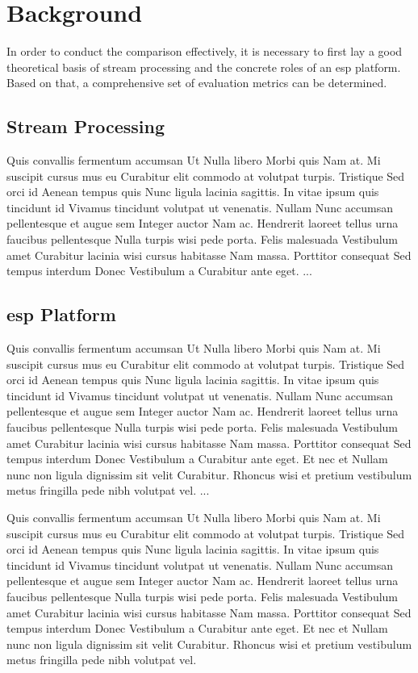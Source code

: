 \chapter{Background} \label{chap:background}
In order to conduct the comparison effectively, it is necessary to first lay a good theoretical basis of stream processing and the concrete roles of an \acrlong{esp} platform. Based on that, a comprehensive set of evaluation metrics can be determined.

\section{Stream Processing}
Quis convallis fermentum accumsan Ut Nulla libero Morbi quis Nam at. Mi suscipit cursus mus eu Curabitur elit commodo at volutpat turpis. Tristique Sed orci id Aenean tempus quis Nunc ligula lacinia sagittis. In vitae ipsum quis tincidunt id Vivamus tincidunt volutpat ut venenatis. Nullam Nunc accumsan pellentesque et augue sem Integer auctor Nam ac. Hendrerit laoreet tellus urna faucibus pellentesque Nulla turpis wisi pede porta. Felis malesuada Vestibulum amet Curabitur lacinia wisi cursus habitasse Nam massa. Porttitor consequat Sed tempus interdum Donec Vestibulum a Curabitur ante eget.
...

\section{\acrlong{esp} Platform}
Quis convallis fermentum accumsan Ut Nulla libero Morbi quis Nam at. Mi suscipit cursus mus eu Curabitur elit commodo at volutpat turpis. Tristique Sed orci id Aenean tempus quis Nunc ligula lacinia sagittis. In vitae ipsum quis tincidunt id Vivamus tincidunt volutpat ut venenatis. Nullam Nunc accumsan pellentesque et augue sem Integer auctor Nam ac. Hendrerit laoreet tellus urna faucibus pellentesque Nulla turpis wisi pede porta. Felis malesuada Vestibulum amet Curabitur lacinia wisi cursus habitasse Nam massa. Porttitor consequat Sed tempus interdum Donec Vestibulum a Curabitur ante eget. Et nec et Nullam nunc non ligula dignissim sit velit Curabitur. Rhoncus wisi et pretium vestibulum metus fringilla pede nibh volutpat vel. ...

Quis convallis fermentum accumsan Ut Nulla libero Morbi quis Nam at. Mi suscipit cursus mus eu Curabitur elit commodo at volutpat turpis. Tristique Sed orci id Aenean tempus quis Nunc ligula lacinia sagittis. In vitae ipsum quis tincidunt id Vivamus tincidunt volutpat ut venenatis. Nullam Nunc accumsan pellentesque et augue sem Integer auctor Nam ac. Hendrerit laoreet tellus urna faucibus pellentesque Nulla turpis wisi pede porta. Felis malesuada Vestibulum amet Curabitur lacinia wisi cursus habitasse Nam massa. Porttitor consequat Sed tempus interdum Donec Vestibulum a Curabitur ante eget. Et nec et Nullam nunc non ligula dignissim sit velit Curabitur. Rhoncus wisi et pretium vestibulum metus fringilla pede nibh volutpat vel.

